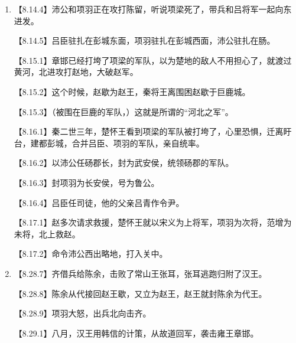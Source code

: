 \documentclass[fontset=none,11pt,a4paper]{ctexart}
\begin{document}
\begin{enumerate}[label=\Alph*.]
\noindent 【8.26.1】正月，项羽自立为西楚霸王，在梁、楚地区的九个郡称王，建都彭城。\par
\noindent 【8.26.2】背弃原来的约定，改立沛公为汉王，在巴、蜀、汉中称玉，建都南郑。\par
\noindent 【8.26.3】把关中瓜分为三，封立秦朝的三个将领：章邯为雍王，建都废丘：司马欣为塞王，建都栎阳；董翳为翟王，建都高奴。\par
\noindent 【8.26.4】封楚将瑕丘申阳为河南王，建都洛阳。\par
\noindent 【8.26.5】封赵将司马印为殷王，建都朝歌。\par
\noindent 【8.26.6】赵王歇迁徙代地称王。\par
\noindent 【8.26.7】封赵将张耳为常山王，建都襄国。\par
  \item
\noindent 【8.14.4】沛公和项羽正在攻打陈留，听说项梁死了，带兵和吕将军一起向东进发。\par
\noindent 【8.14.5】吕臣驻扎在彭城东面，项羽驻扎在彭城西面，沛公驻扎在肠。\par
\noindent 【8.15.1】章邯已经打垮了项梁的军队，以为楚地的敌人不用担心了，就渡过黄河，北进攻打赵地，大破赵军。\par
\noindent 【8.15.2】这个时候，赵歇为赵王，秦将王离围困赵歇于巨鹿城。\par
\noindent 【8.15.3】（被围在巨鹿的军队，）这就是所谓的“河北之军”。\par
\noindent 【8.16.1】秦二世三年，楚怀王看到项梁的军队被打垮了，心里恐惧，迁离盱台，建都彭城，合并吕臣、项羽的军队，亲自统率。\par
\noindent 【8.16.2】以沛公任砀郡长，封为武安侯，统领砀郡的军队。\par
\noindent 【8.16.3】封项羽为长安侯，号为鲁公。\par
\noindent 【8.16.4】吕臣任司徒，他的父亲吕青作令尹。\par
\noindent 【8.17.1】赵多次请求救援，楚怀王就以宋义为上将军，项羽为次将，范增为未将，北上救赵。\par
\noindent 【8.17.2】命令沛公西出略地，打入关中。\par
  \item
\noindent 【8.28.7】齐借兵给陈余，击败了常山王张耳，张耳逃跑归附了汉王。\par
\noindent 【8.28.8】陈余从代接回赵王歇，又立为赵王，赵王就封陈余为代王。\par
\noindent 【8.28.9】项羽大怒，出兵北向击齐。\par
\noindent 【8.29.1】八月，汉王用韩信的计策，从故道回军，袭击雍王章邯。\par

\end{enumerate}
\end{document}
